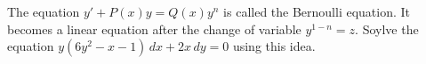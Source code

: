 \documentclass[../hw5]{subfiles}
\begin{document}
The equation $y'+P(x)y=Q(x)y^n$ is called the Bernoulli equation. It becomes a linear equation after the change of variable $y^{1-n}=z$. Soylve the equation $y(6y^2-x-1)\,dx+2x\,dy=0$ using this idea.
\end{document}
